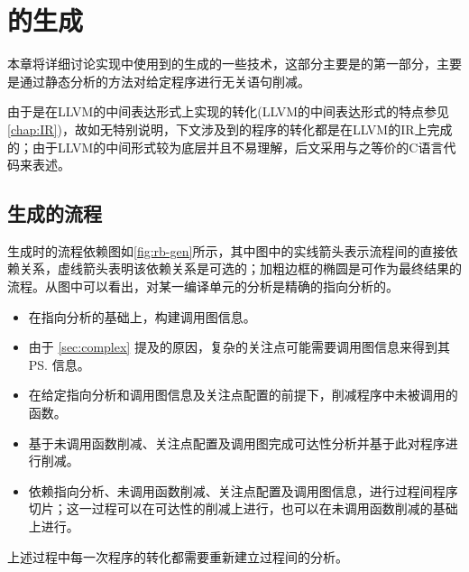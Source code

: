 \chapter{\rbscope 的生成}
\label{chap:impl}

本章将详细讨论\dryrun 实现中使用到的\rbscope 生成的一些技术，这部分主要是\dryrun 的第一部分，主要是通过静态分析的方法对给定程序进行无关语句削减。

由于\dryrun 是在LLVM的中间表达形式上实现的转化(LLVM的中间表达形式的特点参见\autoref{chap:IR})，故如无特别说明，下文涉及到的程序的转化都是在LLVM的IR上完成的；由于LLVM的中间形式较为底层并且不易理解，后文采用与之等价的C语言代码来表述。

\section{生成\rbscope 的流程 }
\label{sec:rb_gen}
生成\rbscope 时的流程依赖图如\autoref{fig:rb-gen}所示，其中图中的实线箭头表示流程间的直接依赖关系，虚线箭头表明该依赖关系是可选的；加粗边框的椭圆是可作为最终结果的流程。从图中可以看出，对某一编译单元的分析是精确的指向分析的。
\begin{itemize}
\item 在指向分析的基础上，构建调用图信息。
\item 由于 \autoref{sec:complex} 提及的原因，复杂的关注点可能需要调用图信息来得到其\prog\ps 信息。
\item 在给定指向分析和调用图信息及关注点配置的前提下，削减程序中未被调用的函数。
\item 基于未调用函数削减、关注点配置及调用图完成可达性分析并基于此对程序进行削减。
\item 依赖指向分析、未调用函数削减、关注点配置及调用图信息，进行过程间程序切片；这一过程可以在可达性的削减上进行，也可以在未调用函数削减的基础上进行。
\end{itemize}
上述过程中每一次程序的转化都需要重新建立过程间的分析。

